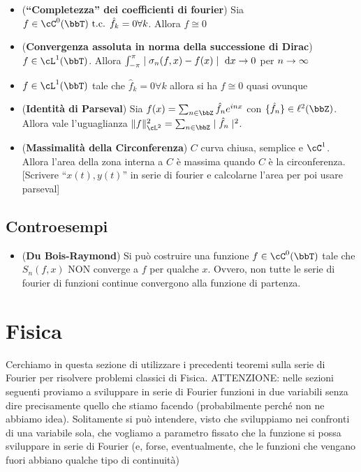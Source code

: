 \documentclass[a4paper,NoNotes,GeneralMath]{stdmdoc}
\newcommand{\intpie}{\int_{-\pi}^\pi }
\newcommand{\CT}[1]{\cC^{#1}(\bbT)}
\newcommand{\LT}[1]{\cL^{#1}(\bbT)}
\newcommand{\cl}{\ell}
\begin{document}
\begin{itemize}
        \item ({\bf ``Completezza'' dei coefficienti di fourier}) Sia $f \in \CT{0} \tc \hat{f}_k = 0 \forall k$. Allora $f \cong 0$
        \item ({\bf Convergenza assoluta in norma della successione di Dirac}) $f \in \LT{1}$. Allora $\intpie \abs{\sigma_n(f, x) - f(x)} \de x \rar 0$ per $n \rightarrow \infty$
        \item $f \in \LT{1}$ tale che $\hat{f}_k = 0 \forall k$ allora si ha $f \cong 0$ quasi ovunque
        \item ({\bf Identità di Parseval}) Sia $f(x) = \sum_{n \in \bbZ} \hat{f}_n e^{inx}$ con $\{\hat{f}_n\} \in \cl^2(\bbZ)$. Allora vale l'uguaglianza $\norm{f}^2_{\cL^2} = \sum_{n \in \bbZ} \abs{\hat{f}_n}^2$.
          \item ({\bf Massimalità della Circonferenza}) $C$ curva chiusa, semplice e $\cC^1$. Allora l'area della zona interna a $C$ è massima quando $C$ è la circonferenza. [Scrivere ``$x(t), y(t)$'' in serie di fourier e calcolarne l'area per poi usare parseval]
        \end{itemize}

        \subsection*{Controesempi}
        \begin{itemize}
        \item ({\bf Du Bois-Raymond}) Si può costruire una funzione $f \in \CT{0}$ tale che $S_n(f, x)$ NON converge a $f$ per qualche $x$. Ovvero, non tutte le serie di fourier di funzioni continue convergono alla funzione di partenza.
        \end{itemize}


        \section*{Fisica}
        Cerchiamo in questa sezione di utilizzare i precedenti teoremi sulla serie di Fourier per risolvere problemi classici di Fisica. ATTENZIONE: nelle sezioni seguenti proviamo a sviluppare in serie di Fourier funzioni in due variabili senza dire precisamente quello che stiamo facendo (probabilmente perché non ne abbiamo idea). Solitamente si può intendere, visto che sviluppiamo nei confronti di una variabile sola, che vogliamo a parametro fissato che la funzione si possa sviluppare in serie di Fourier (e, forse, eventualmente, che le funzioni che vengano fuori abbiano qualche tipo di continuità)
\end{document}
